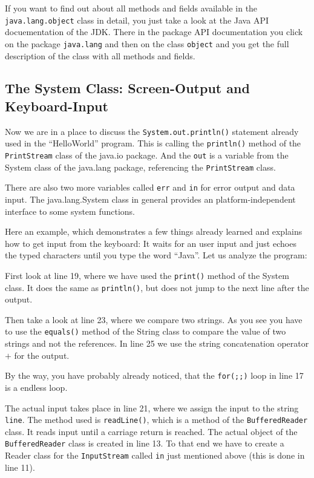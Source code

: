 If you want to find out about all methods and fields available
in the \verb|java.lang.object| class in detail, you just take
a look at the Java API docuementation of the JDK. There in the
package API documentation  you
click on the package \verb|java.lang| and then on the class
\verb|object| and you get the full description of the class
with all methods and fields.


\subsection{The System Class: Screen-Output and Keyboard-Input}

Now we are in a place to discuss the \verb|System.out.println()| statement
already used in the ``HelloWorld'' program. This is calling the
\verb|println()| method of the \verb|PrintStream| class of the java.io 
package. And the \verb|out| is a variable from the System 
class of the java.lang package, referencing the \verb|PrintStream| class. 

There are also two more variables called \verb|err| and
\verb|in| for error output and data input. 
The java.lang.System class in general provides an platform-independent 
interface to some system functions.

Here an example, which demonstrates a few things already learned and
explains how to get input from the keyboard:
It waits for an user input and just echoes the typed characters
until you type the word ``Java''. Let us analyze the program:

First look at line 19, where we have used the \verb|print()| method
of the System class. It does the same as \verb|println()|, but does not
jump to the next line after the output.

Then take a look at line 23, where we compare two strings. As you see
you have to use the \verb|equals()| method of the String class to
compare the value of two strings and not the references. 
In line 25 we use the string concatenation operator $+$ for the output.

By the way, you have probably already noticed, that 
the \verb|for(;;)| loop in line 17 is a endless loop.

The actual input takes place in line 21, where we assign the input
to the string \verb|line|. The method used is \verb|readLine()|, which
is a method of the \verb|BufferedReader| class. It reads input until
a carriage return is reached. The actual object of the 
\verb|BufferedReader| class is created in line 13. To that end we have
to create a Reader class for the \verb|InputStream| called \verb|in|
just mentioned above (this is done in line 11).

